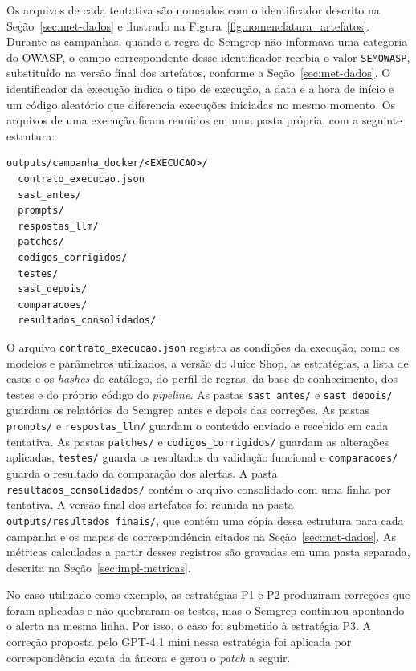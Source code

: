 Os arquivos de cada tentativa são nomeados com o identificador descrito na Seção~\ref{sec:met-dados} e ilustrado na Figura~\ref{fig:nomenclatura_artefatos}. Durante as campanhas, quando a regra do Semgrep não informava uma categoria do OWASP, o campo correspondente desse identificador recebia o valor \texttt{SEMOWASP}, substituído na versão final dos artefatos, conforme a Seção~\ref{sec:met-dados}. O identificador da execução indica o tipo de execução, a data e a hora de início e um código aleatório que diferencia execuções iniciadas no mesmo momento. Os arquivos de uma execução ficam reunidos em uma pasta própria, com a seguinte estrutura:

{\footnotesize
\begin{verbatim}
outputs/campanha_docker/<EXECUCAO>/
  contrato_execucao.json
  sast_antes/
  prompts/
  respostas_llm/
  patches/
  codigos_corrigidos/
  testes/
  sast_depois/
  comparacoes/
  resultados_consolidados/
\end{verbatim}
}

O arquivo \texttt{contrato\_\allowbreak execucao.\allowbreak json} registra as condições da execução, como os modelos e parâmetros utilizados, a versão do Juice Shop, as estratégias, a lista de casos e os \textit{hashes} do catálogo, do perfil de regras, da base de conhecimento, dos testes e do próprio código do \textit{pipeline}. As pastas \texttt{sast\_\allowbreak antes/\allowbreak } e \texttt{sast\_\allowbreak depois/\allowbreak } guardam os relatórios do Semgrep antes e depois das correções. As pastas \texttt{prompts/\allowbreak } e \texttt{respostas\_\allowbreak llm/\allowbreak } guardam o conteúdo enviado e recebido em cada tentativa. As pastas \texttt{patches/\allowbreak } e \texttt{codigos\_\allowbreak corrigidos/\allowbreak } guardam as alterações aplicadas, \texttt{testes/\allowbreak } guarda os resultados da validação funcional e \texttt{comparacoes/\allowbreak } guarda o resultado da comparação dos alertas. A pasta \texttt{resultados\_\allowbreak consolidados/\allowbreak } contém o arquivo consolidado com uma linha por tentativa. A versão final dos artefatos foi reunida na pasta \texttt{outputs/\allowbreak resultados\_\allowbreak finais/\allowbreak }, que contém uma cópia dessa estrutura para cada campanha e os mapas de correspondência citados na Seção~\ref{sec:met-dados}. As métricas calculadas a partir desses registros são gravadas em uma pasta separada, descrita na Seção~\ref{sec:impl-metricas}.

No caso utilizado como exemplo, as estratégias P1 e P2 produziram correções que foram aplicadas e não quebraram os testes, mas o Semgrep continuou apontando o alerta na mesma linha. Por isso, o caso foi submetido à estratégia P3. A correção proposta pelo GPT-4.1 mini nessa estratégia foi aplicada por correspondência exata da âncora e gerou o \textit{patch} a seguir.

